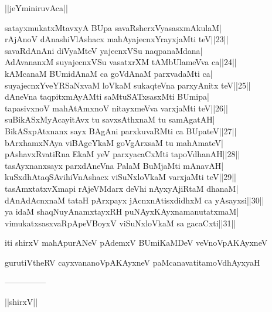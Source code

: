 \documentclass{article}
\begin{document}
\begin{center}
||jeYminiruvAca||
\end{center}

satayxmukatxMtavxyA BUpa savaRsherxVyasasxmAkulaM|\\
rAjAnoV dAnashiVlAshacx mahAyajecnxYrayxjaMti teV||23||\\
savaRdAnAni diVyaMteV yajecnxVSu naqpanaMdana|\\
AdAvananxM suyajecnxVSu vasatxrXM tAMbUlameVva ca||24||\\
kAMcanaM BUmidAnaM ca goVdAnaM parxvadaMti ca|\\
suyajecnxYveYRSaNxvaM loVkaM sukaqteVna parxyAnitx teV||25||\\
dAneVna taqpitxmAyAMti saMtuSATxsasxMti BUmipa|\\
tapasivxnoV mahAtAmxnoV nitayxmeVva varxjaMti teV||26||\\
suBikASxMyAcayitAvx tu savxsAthxnaM tu samAgatAH|\\
BikASxpAtxnanx sayx BAgAni parxkuvaRMti ca BUpateV||27||\\
bArxhamxNAya viBAgeYkaM goVgArxsaM tu mahAmateV|\\
pAshavxRvatiRna EkaM yeV parxyacaCxMti tapoVdhanAH||28||\\
tasAyxnanxsayx parxdAneVna PalaM BuMjaMti mAnavAH|\\
kuSxdhAtaqSAvihiVnAshacx viSuNxloVkaM varxjaMti teV||29||\\
tasAmxtatxvXmapi rAjeVMdarx deVhi nAyxyAjiRtaM dhanaM|\\
dAnAdAcnxnaM tataH pArxpayx jAcnxnAtisxdidhxM ca yAsayxsi||30||\\
ya idaM shaqNuyAnamxtayxRH puNAyxKAyxnamanutatxmaM|\\
vimukatxsasxvaRpApeVBoyxV viSuNxloVkaM sa gacaCxti||31||

\begin{center}
iti shirxV mahApurANeV pAdemxV BUmiKaMDeV veVnoVpAKAyxneV
\end{center}

\begin{center}
gurutiVtheRV cayxvananoVpAKAyxneV paMcanavatitamoVdhAyxyaH
\end{center}

\begin{center}
---------------
\end{center}

\begin{center}
||shirxV||
\end{center}
\end{document}
